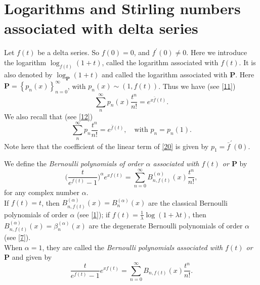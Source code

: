 \documentclass[a4paper,11pt]{amsart}
\begin{document}
\section{Logarithms and Stirling numbers associated with delta series}
Let $f(t)$ be a delta series. So $f(0)=0$, and  $f^{\prime}(0) \ne 0$. Here we introduce the logarithm $\log_{f(t)}(1+t)$, called the logarithm associated with $f(t)$. It is also denoted by $\log_{\mathbf{P}}(1+t)$ and called the logarithm associated with $\mathbf{P}$. Here $\mathbf{P}=\left\{p_{n}(x)\right\}_{n=0}^{\infty}$, with $p_{n}(x) \sim (1, f(t))$. Thus we have (see \eqref{11})
\begin{equation*}
\sum_{n}^{\infty}p_{n}(x)\frac{t^{n}}{n!}=e^{x\bar{f}(t)}.
\end{equation*}
We also recall that (see \eqref{12})
\begin{equation} \label{20}
\sum_{n}^{\infty}p_{n}\frac{t^{n}}{n!}=e^{\bar{f}(t)},\quad \mathrm{with}\,\, p_{n}=p_{n}(1).
\end{equation}
Note here that the coefficient of the linear term of \eqref{20} is given by $p_{1}=\bar{f}^{\prime}(0)$. \par
We define the {\it{Bernoulli polynomials of order $\alpha$ associated with $f(t)$ or $\mathbf{P}$}} by
\begin{equation} \label{21}
\Big(\frac{t}{e^{f(t)}-1}\Big)^{\alpha}e^{xf(t)}=\sum_{n=0}^{\infty}B_{n,f(t)}^{(\alpha)}(x)\frac{t^{n}}{n!},
\end{equation}
for any complex number $\alpha$. \\
If $f(t)=t$, then $B_{n,f(t)}^{(\alpha)}(x)=B_{n}^{(\alpha)}(x)$ are the classical Bernoulli polynomials of order $\alpha$ (see \eqref{1}); if $f(t)=\frac{1}{\lambda}\log(1+\lambda t)$, then $B_{n,f(t)}^{(\alpha)}(x)=\beta_{n}^{(\alpha)}(x)$ are the degenerate Bernoulli polynomials of order $\alpha$ (see \eqref{7}). \\
When $\alpha=1$, they are called the {\it{Bernoulli polynomials associated with $f(t)$ or $\mathbf{P}$}} and given by
\begin{equation*}
\frac{t}{e^{f(t)}-1}e^{xf(t)}=\sum_{n=0}^{\infty}B_{n,f(t)}(x)\frac{t^{n}}{n!}.
\end{equation*}
\end{document}
